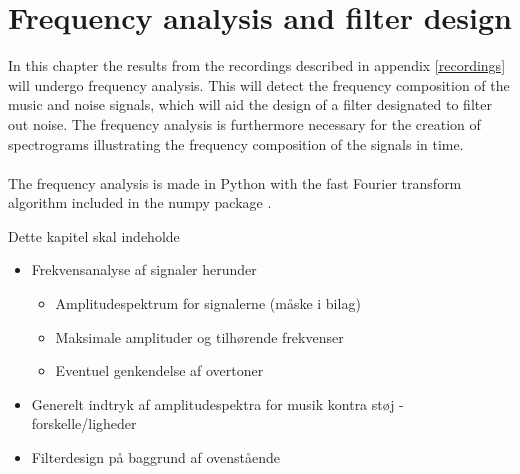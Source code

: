 \chapter{Frequency analysis and filter design} \label{ch9}
In this chapter the results from the recordings described in appendix \ref{recordings} will undergo frequency analysis. This will detect the frequency composition of the music and noise signals, which will aid the design of a filter designated to filter out noise. The frequency analysis is furthermore necessary for the creation of spectrograms illustrating the frequency composition of the signals in time. \\ \\
The frequency analysis is made in Python with the fast Fourier transform algorithm included in the numpy package .

Dette kapitel skal indeholde
\begin{itemize}
\item Frekvensanalyse af signaler herunder
\begin{itemize}
\item Amplitudespektrum for signalerne (måske i bilag)
\item Maksimale amplituder og tilhørende frekvenser
\item Eventuel genkendelse af overtoner
\end{itemize}
\item Generelt indtryk af amplitudespektra for musik kontra støj - forskelle/ligheder
\item Filterdesign på baggrund af ovenstående
\end{itemize}



